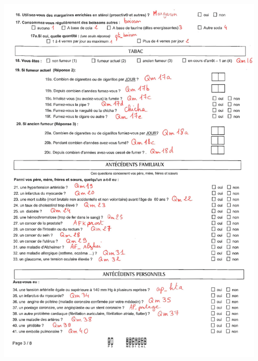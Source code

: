 \documentclass{book}
\begin{document}
\includegraphics[scale=.28]{quest_ipc-3.png}
\newpage
\end{document}
